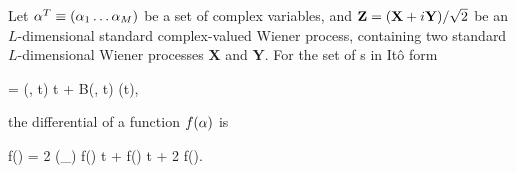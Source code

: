 \begin{theorem}
\label{thm:fpe-sde:ito-formula:ito-f-complex}
	Let $\mathbf{\alpha}^T \equiv (\alpha_1 \ldots \alpha_M)$ be a set of complex variables, and $\mathbf{Z} = (\mathbf{X} + i\mathbf{Y}) / \sqrt{2}$ be an $L$-dimensional standard complex-valued Wiener process, containing two standard $L$-dimensional Wiener processes $\mathbf{X}$ and $\mathbf{Y}$.
	For the set of s in It\^{o} form
	\begin{eqn*}
		\upd\balpha = \avec(\balpha, t) \upd t + B(\balpha, t) \upd\Zvec(t),
	\end{eqn*}
	the differential of a function $f(\mathbf{\alpha})$ is
	\begin{eqn*}
		\upd f(\balpha) =
			2 \Real (\avec \cdot \vcwd_{\balpha}) f(\balpha) \upd t
			+  f(\balpha) \upd t
			+ 2 \Real {} f(\balpha).
	\end{eqn*}
\end{theorem}

